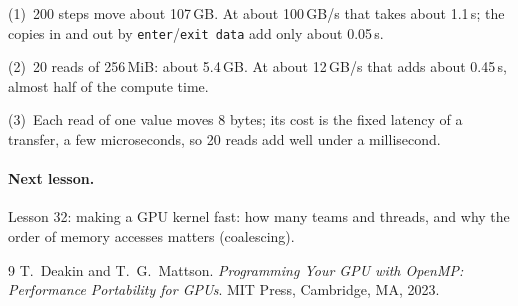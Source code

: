 \documentclass[11pt,a4paper]{article}
\let\origtexttt\texttt
\renewcommand{\texttt}[1]{\textcolor{black!60}{\origtexttt{#1}}}
\begin{document}
\noindent(1)~200 steps move about 107\,GB. At about 100\,GB/s that takes about 1.1\,s; the
copies in and out by \texttt{enter}/\texttt{exit data} add only about 0.05\,s.

\noindent(2)~20 reads of 256\,MiB: about 5.4\,GB. At about 12\,GB/s that adds about 0.45\,s,
almost half of the compute time.

\noindent(3)~Each read of one value moves 8 bytes; its cost is the fixed latency of a transfer,
a few microseconds, so 20 reads add well under a millisecond.

\paragraph{Next lesson.} Lesson 32: making a GPU kernel fast: how many teams and threads, and
why the order of memory accesses matters (coalescing).

\begin{thebibliography}{9}
 T.~Deakin and T.~G.~Mattson. \emph{Programming Your GPU with OpenMP: Performance
  Portability for GPUs}. MIT Press, Cambridge, MA, 2023.
\end{thebibliography}
\end{document}
